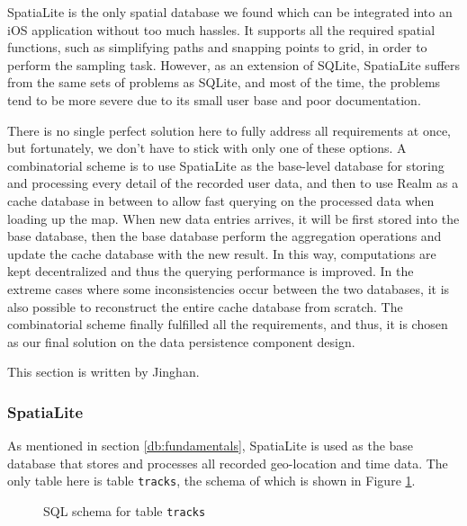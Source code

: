 \documentclass[12pt,a4paper]{article}
\begin{document}
            SpatiaLite is the only spatial database we found which can be integrated into an iOS application without too much hassles. It supports all the required spatial functions, such as simplifying paths and snapping points to grid, in order to perform the sampling task. However, as an extension of SQLite, SpatiaLite suffers from the same sets of problems as SQLite, and most of the time, the problems tend to be more severe due to its small user base and poor documentation.
            
            There is no single perfect solution here to fully address all requirements at once, but fortunately, we don't have to stick with only one of these options. A combinatorial scheme is to use SpatiaLite as the base-level database for storing and processing every detail of the recorded user data, and then to use Realm as a cache database in between to allow fast querying on the processed data when loading up the map. When new data entries arrives, it will be first stored into the base database, then the base database perform the aggregation operations and update the cache database with the new result. In this way, computations are kept decentralized and thus the querying performance is improved. In the extreme cases where some inconsistencies occur between the two databases, it is also possible to reconstruct the entire cache database from scratch. The combinatorial scheme finally fulfilled all the requirements, and thus, it is chosen as our final solution on the data persistence component design.
            
            \footnotesize
            This section is written by Jinghan.
            \normalsize
            
            \subsubsection{SpatiaLite} %
            As mentioned in section \ref{db:fundamentals}, SpatiaLite is used as the base database that stores and processes all recorded geo-location and time data. The only table here is table \texttt{tracks}, the schema of which is shown in Figure \ref{fig:schema}.
            
            \begin{figure}
                \lstset{style=sqlStyle}
                \centering
                
                \caption{SQL schema for table \texttt{tracks}}
                \label{fig:schema}
            \end{figure}
                
\end{document}
